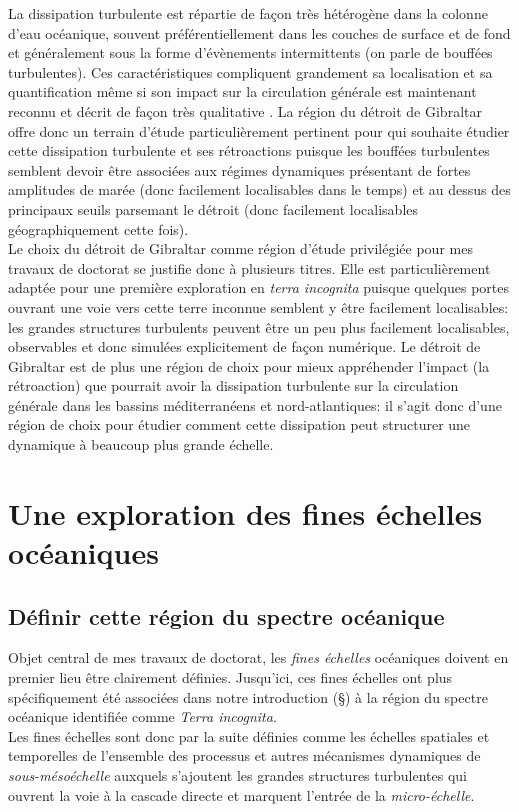 \color{blue}
La dissipation turbulente est répartie de façon très hétérogène dans la colonne d'eau océanique, souvent préférentiellement dans les couches de surface et de fond et généralement sous la forme d'évènements intermittents (on parle de bouffées turbulentes). Ces caractéristiques compliquent grandement sa localisation et sa quantification même si son impact sur la circulation générale est maintenant reconnu et décrit de façon très qualitative \cite{de_lavergne_abyssal_2017}. La région du détroit de Gibraltar offre donc un terrain d'étude particulièrement pertinent pour qui souhaite étudier cette dissipation turbulente et ses rétroactions puisque les bouffées turbulentes semblent devoir être associées aux régimes dynamiques présentant de fortes amplitudes de marée (donc facilement localisables dans le temps) et au dessus des principaux seuils parsemant le détroit (donc facilement localisables géographiquement cette fois).\\
Le choix du détroit de Gibraltar comme région d'étude privilégiée pour mes travaux de doctorat se justifie donc à plusieurs titres. Elle est particulièrement adaptée pour une première exploration en \textit{terra incognita} puisque quelques portes ouvrant une voie vers cette terre inconnue semblent y être facilement localisables: les grandes structures turbulents peuvent être un peu plus facilement localisables, observables et donc simulées explicitement de façon numérique. Le détroit de Gibraltar est de plus une région de choix pour mieux appréhender l'impact (la rétroaction) que pourrait avoir la dissipation turbulente sur la circulation générale dans les bassins méditerranéens et nord-atlantiques: il s'agit donc d'une région de choix pour étudier comment cette dissipation peut structurer une dynamique à beaucoup plus grande échelle.
\color{black}

\color{blue}
\section{Une exploration des fines échelles océaniques}
\subsection{Définir cette région du spectre océanique}
Objet central de mes travaux de doctorat, les \textit{fines échelles} océaniques doivent en premier lieu être clairement définies. Jusqu'ici, ces fines échelles ont plus spécifiquement été associées dans notre introduction (\S {}) à la région du spectre océanique identifiée comme \textit{Terra incognita}.\\
Les fines échelles sont donc par la suite définies comme les échelles spatiales et temporelles de l'ensemble des processus et autres mécanismes dynamiques de \textit{sous-mésoéchelle} \citep{mcwilliams_submesoscale_2016} auxquels s'ajoutent les grandes structures turbulentes qui ouvrent la voie à la cascade directe et marquent l'entrée de la \textit{micro-échelle}.
 \color{black}

